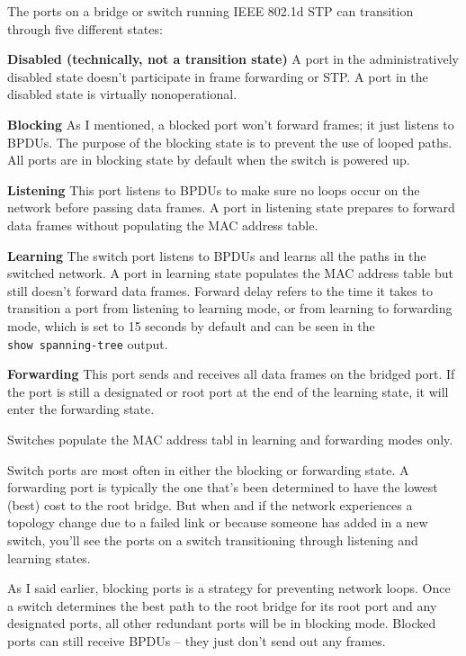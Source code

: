 The ports on a bridge or switch running IEEE 802.1d STP can transition
through five different states:

\textbf{Disabled (technically, not a transition state)} A port in the
administratively disabled state doesn't participate in frame forwarding
or STP. A port in the disabled state is virtually nonoperational.

\textbf{Blocking} As I mentioned, a blocked port won't forward frames;
it just listens to BPDUs. The purpose of the blocking state is to
prevent the use of looped paths. All ports are in blocking state by
default when the switch is powered up.

\textbf{Listening} This port listens to BPDUs to make sure no loops
occur on the network before passing data frames. A port in listening
state prepares to forward data frames without populating the MAC address
table.

\textbf{Learning} The switch port listens to BPDUs and learns all the
paths in the switched network. A port in learning state populates the
MAC address table but still doesn't forward data frames. Forward delay
refers to the time it takes to transition a port from listening to
learning mode, or from learning to forwarding mode, which is set to 15
seconds by default and can be seen in the \texttt{show\ spanning-tree}
output.

\textbf{Forwarding}
This port sends and receives all data frames on the bridged port. If the
port is still a designated or root port at the end of the learning
state, it will enter the forwarding state.

\begin{note}
Switches populate the MAC address tabl in learning and forwarding modes only.
\end{note}

Switch ports are most often in either the blocking or forwarding state.
A forwarding port is typically the one that's been determined to have
the lowest (best) cost to the root bridge. But when and if the network
experiences a topology change due to a failed link or because someone
has added in a new switch, you'll see the ports on a switch
transitioning through listening and learning states.

As I said earlier, blocking ports is a strategy for preventing network
loops. Once a switch determines the best path to the root bridge for its
root port and any designated ports, all other redundant ports will be in
blocking mode. Blocked ports can still receive BPDUs -- they just don't
send out any frames.

